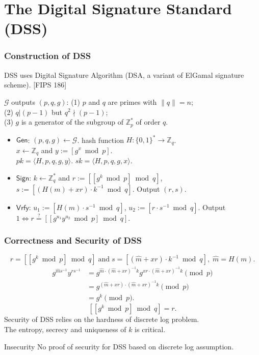 \section{The Digital Signature Standard (DSS)}
\begin{frame}\frametitle{Construction of DSS}
DSS uses Digital Signature Algorithm (DSA, a variant of ElGamal signature scheme). [FIPS 186]
\begin{construction}
$\mathcal{G}$ outputs $(p,q,g)$: (1) $p$ and $q$ are primes with $\|q\| =n$;\\
(2) $q|(p-1)$ but $q^2 \nmid (p-1)$;\\
(3) $g$ is a generator of the subgroup of $\mathbb{Z}^*_p$ of order $q$.
\begin{itemize}
\item $\mathsf{Gen}$: $(p,q,g) \gets \mathcal{G}$. hash function $H : \{0,1\}^* \to \mathbb{Z}_q$. \\
$x \gets \mathbb{Z}_q$ and $y:= [g^x \bmod p]$.\\
$pk = \langle H,p,q,g,y\rangle$. $sk=\langle H,p,q,g,x\rangle$.
\item $\mathsf{Sign}$: $k\gets \mathbb{Z}^*_q$ and $r:= [[g^k \bmod p] \bmod q]$, $s:= [(H(m)+xr)\cdot k^{-1} \bmod q]$. Output $(r,s)$.
\item $\mathsf{Vrfy}$: $u_1 := [H(m)\cdot s^{-1} \bmod q]$, $u_2 := [r\cdot s^{-1} \bmod q]$. Output $1 \iff r \overset{?}{=} [[g^{u_1}y^{u_2} \bmod p]\bmod q].$
\end{itemize}
\end{construction}
\end{frame}
\begin{frame}\frametitle{Correctness and Security of DSS}
\[r = [[g^k \bmod p] \bmod q]\; \text{and}\; s= [(\hat{m}+xr)\cdot k^{-1} \bmod q],\; \hat{m}=H(m). \]
\begin{align*}g^{\hat{m}s^{-1}}y^{rs^{-1}} &= g^{\hat{m}\cdot (\hat{m}+xr)^{-1}k}g^{xr\cdot (\hat{m}+xr)^{-1}k} \pmod p \\
	&= g^{(\hat{m}+xr)\cdot (\hat{m}+xr)^{-1}k} \pmod p \\  
	&= g^k \pmod p.
	\end{align*}
\[ [[g^k \bmod p] \bmod q] = r.\]
Security of DSS relies on the hardness of discrete log problem.\\
The entropy, secrecy and uniqueness of $k$ is critical.
\begin{alertblock}{Insecurity}
No proof of security for DSS based on discrete log assumption.
\end{alertblock}
\end{frame}

